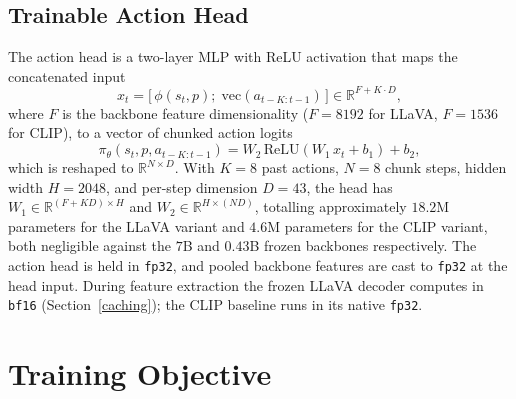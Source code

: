\subsection{Trainable Action Head} \label{action_head}
The action head is a two-layer MLP with ReLU activation that maps the
concatenated input
\begin{equation}
    x_t = \bigl[\,\phi(s_t, p);\; \mathrm{vec}(a_{t-K:t-1})\,\bigr]
    \in \mathbb{R}^{F + K \cdot D},
\end{equation}
where $F$ is the backbone feature dimensionality ($F = 8192$ for LLaVA,
$F = 1536$ for CLIP), to a vector of chunked action logits
\begin{equation}
    \pi_\theta(s_t, p, a_{t-K:t-1}) = W_2 \, \mathrm{ReLU}(W_1 \, x_t + b_1) + b_2,
\end{equation}
which is reshaped to $\mathbb{R}^{N \times D}$. With $K = 8$ past actions,
$N = 8$ chunk steps, hidden width $H = 2048$, and per-step dimension
$D = 43$, the head has $W_1 \in \mathbb{R}^{(F + K D) \times H}$ and
$W_2 \in \mathbb{R}^{H \times (N D)}$, totalling approximately $18.2$M
parameters for the LLaVA variant and $4.6$M parameters for the CLIP variant,
both negligible against the $7$B and $0.43$B frozen backbones respectively.
The action head is held in \texttt{fp32}, and pooled backbone
features are cast to \texttt{fp32} at the head input. During feature
extraction the frozen LLaVA decoder computes in \texttt{bf16}
(Section~\ref{caching}); the CLIP baseline runs in its native \texttt{fp32}.

\section{Training Objective}

